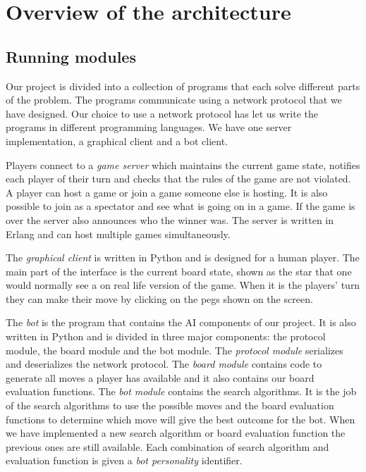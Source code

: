 \documentclass[a4paper,11pt]{article}
\begin{document}
\section{Overview of the architecture}
\subsection{Running modules}

Our project is divided into a collection of programs that each solve
different parts of the problem. The programs communicate using a
network protocol that we have designed. Our choice to use a network
protocol has let us write the programs in different programming
languages. We have one server implementation, a graphical client and a
bot client.


Players connect to a \emph{game server} which maintains the current
game state, notifies each player of their turn and checks that the
rules of the game are not violated. A player can host a game or join a
game someone else is hosting. It is also possible to join as a
spectator and see what is going on in a game. If the game is over the
server also announces who the winner was. The server is written in
Erlang and can host multiple games simultaneously.

The \emph{graphical client} is written in Python and is designed for a
human player. The main part of the interface is the current board
state, shown as the star that one would normally see a on real life
version of the game. When it is the players' turn they can make their
move by clicking on the pegs shown on the screen.

The \emph{bot} is the program that contains the AI components of our
project. It is also written in Python and is divided in three major
components: the protocol module, the board module and the bot module.
The \emph{protocol module} serializes and deserializes the network protocol.
The \emph{board module} contains code to generate all moves a player has
available and it also contains our board evaluation functions. The
\emph{bot module} contains the search algorithms. It is the job of the search
algorithms to use the possible moves and the board evaluation
functions to determine which move will give the best outcome for the
bot. When we have implemented a new search algorithm or board
evaluation function the previous ones are still available. Each
combination of search algorithm and evaluation function is given a
\emph{bot personality} identifier.
\end{document}
